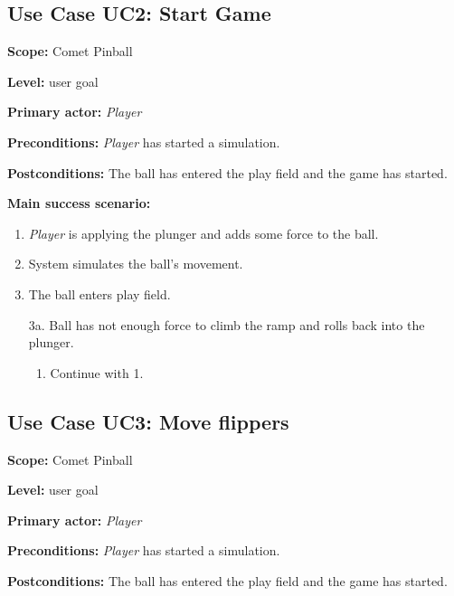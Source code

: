 \documentclass[fontsize=12pt,
               paper=a4,
               twoside=false,
               parskip=half,
               ]{scrartcl}
\begin{document}

\subsection{Use Case UC2: Start Game}

\textbf{\textsf{Scope:}} Comet Pinball

\textbf{\textsf{Level:}} user goal

\textbf{\textsf{Primary actor:}} \emph{Player}

\textbf{\textsf{Preconditions:}} \emph{Player} has started a simulation.

\textbf{\textsf{Postconditions:}} The ball has entered the play field and the game has started.

\textbf{\textsf{Main success scenario:}}

\begin{enumerate}[leftmargin=3em]
	\item \emph{Player} is applying the plunger and adds some force to the ball.
	\item System simulates the ball's movement.
	\item The ball enters play field.
\end{enumerate}


\begin{itemize}[leftmargin=3em]
	\item[3a.] Ball has not enough force to climb the ramp and rolls back into the plunger.
	\begin{enumerate}
		\item Continue with 1.
	\end{enumerate}
\end{itemize}





\subsection{Use Case UC3: Move flippers}

\textbf{\textsf{Scope:}} Comet Pinball

\textbf{\textsf{Level:}} user goal

\textbf{\textsf{Primary actor:}} \emph{Player}

\textbf{\textsf{Preconditions:}} \emph{Player} has started a simulation.

\textbf{\textsf{Postconditions:}} The ball has entered the play field and the game has started.
\end{document}
